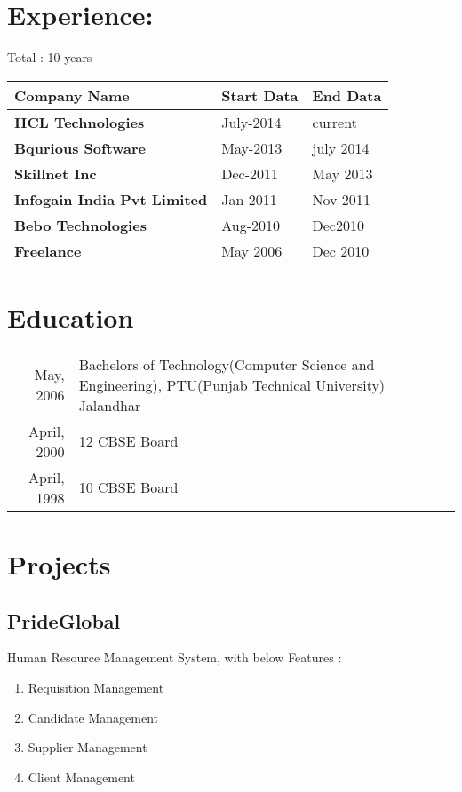 \documentclass[letterpaper]{article}
\begin{document}
\section{Experience:}
\label{sec:orgheadline4}

Total : 10 years 
\begin{center}
\begin{tabular}{lll}
\textbf{Company Name} & \textbf{Start Data} & \textbf{End Data}\\
\hline
\textbf{HCL Technologies} & July-2014 & current\\
\textbf{Bqurious Software} & May-2013 & july 2014\\
\textbf{Skillnet Inc} & Dec-2011 & May 2013\\
\textbf{Infogain India Pvt Limited} & Jan 2011 & Nov 2011\\
\textbf{Bebo Technologies} & Aug-2010 & Dec2010\\
\textbf{Freelance} & May 2006 & Dec 2010\\
\end{tabular}
\end{center}

\section{Education}
\label{sec:orgheadline5}
\begin{center}
\begin{tabular}{rp{}}
May, 2006 & Bachelors of Technology(Computer Science and Engineering),   PTU(Punjab Technical University) Jalandhar\\
April, 2000 & 12         CBSE Board\\
April, 1998 & 10         CBSE Board\\
\end{tabular}
\end{center}

\section{Projects}
\label{sec:orgheadline23}

\subsection{PrideGlobal}
\label{sec:orgheadline8}
Human Resource Management System, with below  Features :
\begin{enumerate}
\item Requisition Management
\item Candidate Management
\item Supplier Management
\item Client Management
\end{enumerate}
\end{document}
